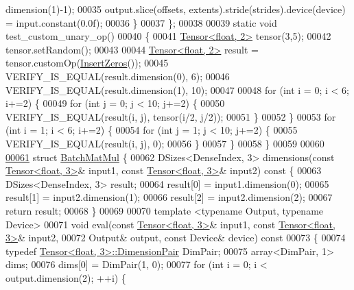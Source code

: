 \begin{DoxyCode}
      dimension(1)-1);
00035     output.slice(offsets, extents).stride(strides).device(device) = input.constant(0.0f);
00036   \}
00037 \};
00038 
00039 \textcolor{keyword}{static} \textcolor{keywordtype}{void} test\_custom\_unary\_op()
00040 \{
00041   \hyperlink{class_eigen_1_1_tensor}{Tensor<float, 2>} tensor(3,5);
00042   tensor.setRandom();
00043 
00044   \hyperlink{class_eigen_1_1_tensor}{Tensor<float, 2>} result = tensor.customOp(\hyperlink{struct_insert_zeros}{InsertZeros}());
00045   VERIFY\_IS\_EQUAL(result.dimension(0), 6);
00046   VERIFY\_IS\_EQUAL(result.dimension(1), 10);
00047 
00048   \textcolor{keywordflow}{for} (\textcolor{keywordtype}{int} i = 0; i < 6; i+=2) \{
00049     \textcolor{keywordflow}{for} (\textcolor{keywordtype}{int} j = 0; j < 10; j+=2) \{
00050       VERIFY\_IS\_EQUAL(result(i, j), tensor(i/2, j/2));
00051     \}
00052   \}
00053   \textcolor{keywordflow}{for} (\textcolor{keywordtype}{int} i = 1; i < 6; i+=2) \{
00054     \textcolor{keywordflow}{for} (\textcolor{keywordtype}{int} j = 1; j < 10; j+=2) \{
00055       VERIFY\_IS\_EQUAL(result(i, j), 0);
00056     \}
00057   \}
00058 \}
00059 
00060 
\hyperlink{struct_batch_mat_mul}{00061} \textcolor{keyword}{struct }\hyperlink{struct_batch_mat_mul}{BatchMatMul} \{
00062   DSizes<DenseIndex, 3> dimensions(\textcolor{keyword}{const} \hyperlink{class_eigen_1_1_tensor}{Tensor<float, 3>}& input1, \textcolor{keyword}{const} 
      \hyperlink{class_eigen_1_1_tensor}{Tensor<float, 3>}& input2)\textcolor{keyword}{ const }\{
00063     DSizes<DenseIndex, 3> result;
00064     result[0] = input1.dimension(0);
00065     result[1] = input2.dimension(1);
00066     result[2] = input2.dimension(2);
00067     \textcolor{keywordflow}{return} result;
00068   \}
00069 
00070   \textcolor{keyword}{template} <\textcolor{keyword}{typename} Output, \textcolor{keyword}{typename} Device>
00071   \textcolor{keywordtype}{void} eval(\textcolor{keyword}{const} \hyperlink{class_eigen_1_1_tensor}{Tensor<float, 3>}& input1, \textcolor{keyword}{const} 
      \hyperlink{class_eigen_1_1_tensor}{Tensor<float, 3>}& input2,
00072             Output& output, \textcolor{keyword}{const} Device& device)\textcolor{keyword}{ const}
00073 \textcolor{keyword}{  }\{
00074     \textcolor{keyword}{typedef} \hyperlink{class_eigen_1_1_tensor}{Tensor<float, 3>::DimensionPair} DimPair;
00075     array<DimPair, 1> dims;
00076     dims[0] = DimPair(1, 0);
00077     \textcolor{keywordflow}{for} (\textcolor{keywordtype}{int} i = 0; i < output.dimension(2); ++i) \{

\end{DoxyCode}
